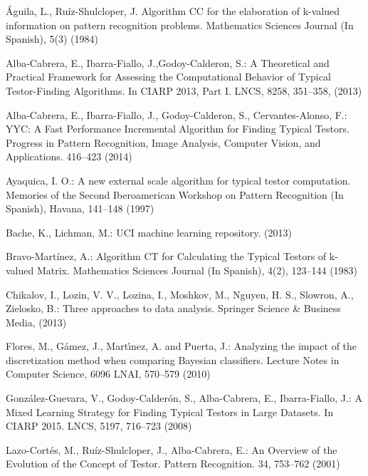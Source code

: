 \documentclass[citenumber]{llncs}
\begin{document}
%
\begin{thebibliography}{}
%

	Águila, L., Ruíz-Shulcloper, J.  
	Algorithm CC for the elaboration of k-valued information on pattern recognition problems. 
	Mathematics Sciences Journal (In Spanish), 
	5(3) (1984)
	
	Alba-Cabrera, E., Ibarra-Fiallo, J.,Godoy-Calderon, S.:
	A Theoretical and Practical Framework for Assessing the Computational Behavior of Typical Testor-Finding Algorithms.
	In CIARP 2013, Part I. LNCS,
	8258, 351--358, (2013)
	
	Alba-Cabrera, E., Ibarra-Fiallo, J., Godoy-Calderon, S., Cervantes-Alonso, F.:
	YYC: A Fast Performance Incremental Algorithm for Finding Typical Testors.
	Progress in Pattern Recognition, Image Analysis, Computer Vision, and Applications.
	416--423 (2014)
	
	Ayaquica, I. O.:
	A new external scale algorithm for typical testor computation.
	Memories of the Second Iberoamerican Workshop on Pattern Recognition (In Spanish), 
	Havana, 141--148 (1997)
	
	Bache, K., Lichman, M.:
	UCI machine learning repository.
	(2013)
	
	Bravo-Martínez, A.:
	Algorithm CT for Calculating the Typical Testors of k-valued Matrix. 
	Mathematics Sciences Journal (In Spanish), 
	4(2), 123--144 (1983)
	
	Chikalov, I., Lozin, V. V., Lozina, I., Moshkov, M., Nguyen, H. S., Slowron, A., Zielosko, B.:
 	Three approaches to data analysis. 
 	Springer Science \& Business Media, 
 	(2013)
	
	Flores, M., G\'{a}mez, J., Mart\'{\i}nez, A. and Puerta, J.:
	Analyzing the impact of the discretization method when comparing Bayesian classifiers.
	Lecture Notes in Computer Science,
	6096 LNAI,  570--579 (2010)

	González-Guevara, V., Godoy-Calderón, S., Alba-Cabrera, E.,  Ibarra-Fiallo, J.:
	A Mixed Learning Strategy for Finding Typical Testors in Large Datasets. 
	In CIARP 2015. LNCS,
	5197, 716--723 (2008)
		
	Lazo-Cort\'es, M., Ruíz-Shulcloper, J., Alba-Cabrera, E.:
	An Overview of the Evolution of the Concept of Testor. 
	Pattern Recognition. 34, 753--762 (2001)


\end{thebibliography}
\end{document}
